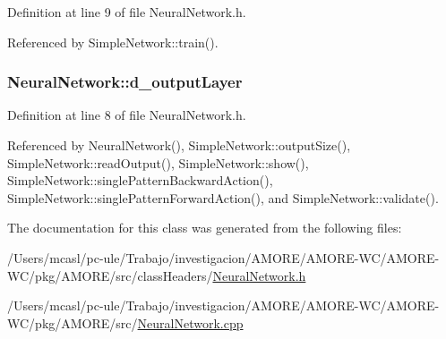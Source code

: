 Definition at line 9 of file NeuralNetwork.h.



Referenced by SimpleNetwork::train().

\hypertarget{class_neural_network_af61fb83fcaaf81c5fa0574f7d3bdc268}{
\subsubsection[{d\_\-outputLayer}]{ {\bf NeuralNetwork::d\_\-outputLayer}}}
\label{class_neural_network_af61fb83fcaaf81c5fa0574f7d3bdc268}


Definition at line 8 of file NeuralNetwork.h.



Referenced by NeuralNetwork(), SimpleNetwork::outputSize(), SimpleNetwork::readOutput(), SimpleNetwork::show(), SimpleNetwork::singlePatternBackwardAction(), SimpleNetwork::singlePatternForwardAction(), and SimpleNetwork::validate().



The documentation for this class was generated from the following files:\begin{DoxyCompactItemize}
\item 
/Users/mcasl/pc-\/ule/Trabajo/investigacion/AMORE/AMORE-\/WC/AMORE-\/WC/pkg/AMORE/src/classHeaders/\hyperlink{_neural_network_8h}{NeuralNetwork.h}\item 
/Users/mcasl/pc-\/ule/Trabajo/investigacion/AMORE/AMORE-\/WC/AMORE-\/WC/pkg/AMORE/src/\hyperlink{_neural_network_8cpp}{NeuralNetwork.cpp}\end{DoxyCompactItemize}
